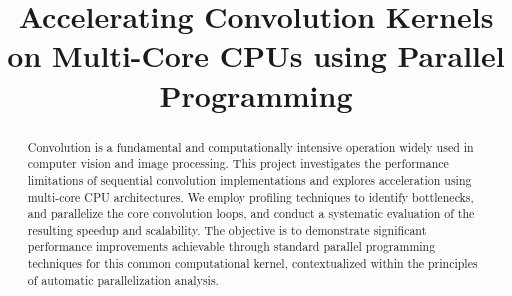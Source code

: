 \documentclass[conference, 10pt]{IEEEtran}
\begin{document}
\title{Accelerating Convolution Kernels on Multi-Core CPUs using Parallel Programming}
\author{
\and
\and
\and
}


\maketitle 

\begin{abstract}
Convolution is a fundamental and computationally intensive operation widely used in computer vision and image processing. This project investigates the performance limitations of sequential convolution implementations and explores acceleration using multi-core CPU architectures. We employ profiling techniques to identify bottlenecks, and parallelize the core convolution loops, and conduct a systematic evaluation of the resulting speedup and scalability. The objective is to demonstrate significant performance improvements achievable through standard parallel programming techniques for this common computational kernel, contextualized within the principles of automatic parallelization analysis.
\end{abstract}
\end{document}
